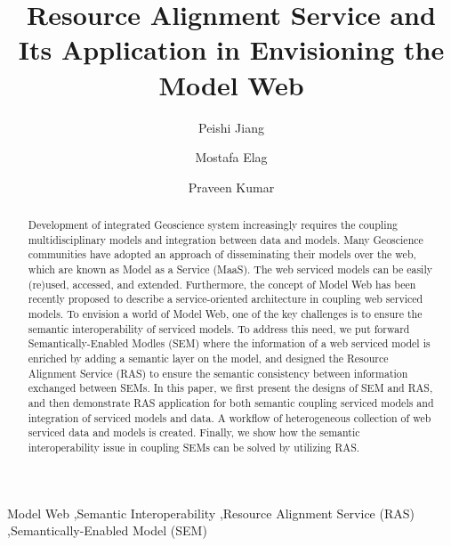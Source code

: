 \documentclass[review]{elsarticle}
\begin{document}
\begin{frontmatter}

\title{Resource Alignment Service and Its Application in Envisioning the Model Web}

\author[address]{Peishi Jiang}
\author[address]{Mostafa Elag}
\author[address]{Praveen Kumar}


\address[address]{Ven Te Chow, Hydrosystem Laboratory, Civil and Environmental Engineering, University of Illinois, Urbana, USA}

\begin{abstract}
Development of integrated Geoscience system increasingly requires the coupling multidisciplinary models and integration between data and models. Many Geoscience communities have adopted an approach of disseminating their models over the web, which are known as Model as a Service (MaaS). The web serviced models can be easily (re)used, accessed, and extended. Furthermore, the concept of Model Web has been recently proposed to describe a service-oriented architecture in coupling web serviced models. To envision a world of Model Web, one of the key challenges is to ensure the semantic interoperability of serviced models. To address this need, we put forward Semantically-Enabled Modles (SEM) where the information of a web serviced model is enriched by adding a semantic layer on the model, and designed the Resource Alignment Service (RAS) to ensure the semantic consistency between information exchanged between SEMs. In this paper, we first present the designs of SEM and RAS, and then demonstrate RAS application for both semantic coupling serviced models and integration of serviced models and data. A workflow of heterogeneous collection of web serviced data and models is created. Finally, we show how the semantic interoperability issue in coupling SEMs can be solved by utilizing RAS.
\end{abstract}

\begin{keyword}
Model Web \sep Semantic Interoperability \sep Resource Alignment Service (RAS) \sep Semantically-Enabled Model (SEM) 
\end{keyword}

\end{frontmatter}

\linenumbers
\end{document}
